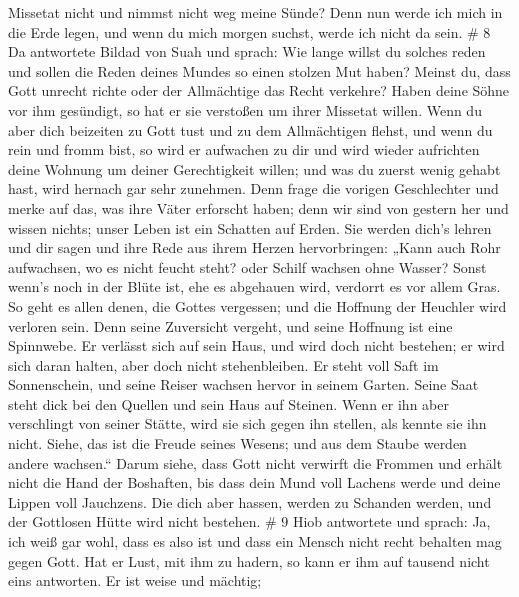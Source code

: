 Missetat nicht und nimmst nicht weg meine Sünde? Denn nun werde ich mich
in die Erde legen, und wenn du mich morgen suchst, werde ich nicht da
sein. \# 8  Da antwortete Bildad von Suah und sprach:
 Wie lange willst du solches reden und sollen die Reden
deines Mundes so einen stolzen Mut haben?  Meinst du, dass
Gott unrecht richte oder der Allmächtige das Recht verkehre?
 Haben deine Söhne vor ihm gesündigt, so hat er sie
verstoßen um ihrer Missetat willen.  Wenn du aber dich
beizeiten zu Gott tust und zu dem Allmächtigen flehst,  und
wenn du rein und fromm bist, so wird er aufwachen zu dir und wird wieder
aufrichten deine Wohnung um deiner Gerechtigkeit willen; 
und was du zuerst wenig gehabt hast, wird hernach gar sehr zunehmen.
 Denn frage die vorigen Geschlechter und merke auf das, was
ihre Väter erforscht haben;  denn wir sind von gestern her
und wissen nichts; unser Leben ist ein Schatten auf Erden. 
Sie werden dich's lehren und dir sagen und ihre Rede aus ihrem Herzen
hervorbringen:  „Kann auch Rohr aufwachsen, wo es nicht
feucht steht? oder Schilf wachsen ohne Wasser?  Sonst
wenn's noch in der Blüte ist, ehe es abgehauen wird, verdorrt es vor
allem Gras.  So geht es allen denen, die Gottes vergessen;
und die Hoffnung der Heuchler wird verloren sein.  Denn
seine Zuversicht vergeht, und seine Hoffnung ist eine Spinnwebe.
 Er verlässt sich auf sein Haus, und wird doch nicht
bestehen; er wird sich daran halten, aber doch nicht stehenbleiben.
 Er steht voll Saft im Sonnenschein, und seine Reiser
wachsen hervor in seinem Garten.  Seine Saat steht dick bei
den Quellen und sein Haus auf Steinen.  Wenn er ihn aber
verschlingt von seiner Stätte, wird sie sich gegen ihn stellen, als
kennte sie ihn nicht.  Siehe, das ist die Freude seines
Wesens; und aus dem Staube werden andere wachsen.``  Darum
siehe, dass Gott nicht verwirft die Frommen und erhält nicht die Hand
der Boshaften,  bis dass dein Mund voll Lachens werde und
deine Lippen voll Jauchzens.  Die dich aber hassen, werden
zu Schanden werden, und der Gottlosen Hütte wird nicht bestehen. \# 9
 Hiob antwortete und sprach:  Ja, ich weiß gar
wohl, dass es also ist und dass ein Mensch nicht recht behalten mag
gegen Gott.  Hat er Lust, mit ihm zu hadern, so kann er ihm
auf tausend nicht eins antworten.  Er ist weise und mächtig;

